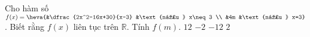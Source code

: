 \begin{ex}%
Cho hàm số $f(x)=\heva{&\dfrac{2x^2-16x+30}{x-3} &\text{nếu } x\neq 3 \\
&4m &\text{nếu } x=3}$. Biết rằng $f(x)$ liên tục trên $\mathbb{R}$. Tính $f(m)$.
\choice
{$12$}
{$-2$}
{\True $-12$}
{$2$}
\end{ex}